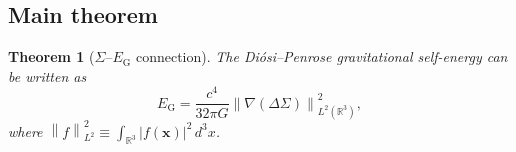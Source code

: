 \documentclass[letterpaper,twocolumn,superscriptaddress,longbibliography]{revtex4-2}
\newtheorem{theorem}{Theorem}[section]
\newcommand{\norm}[1]{\left\|#1\right\|}
\newcommand{\EG}{E_{\mathrm{G}}}
\newcommand{\DSigma}{\Delta\Sigma}
\begin{document}
\subsection{Main theorem}

\begin{theorem}[$\Sigma$--$\EG$ connection]
\label{thm:Sigma_EG}
The Di\'{o}si--Penrose gravitational self-energy can be written
as
\begin{equation}
  \EG = \frac{c^4}{32\pi G}
        \norm{\nabla(\DSigma)}^2_{L^2(\mathbb{R}^3)},
  \label{eq:EG_Sigma}
\end{equation}
where $\norm{f}^2_{L^2} \equiv \int_{\mathbb{R}^3} |f(\bm{x})|^2
\, d^3x$.
\end{theorem}
\end{document}
